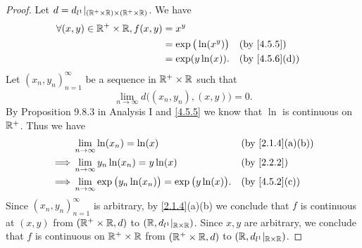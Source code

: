 \begin{proof}
  Let \(d = d_{l^1}|_{(\mathbb{R}^+ \times \mathbb{R}) \times (\mathbb{R}^+ \times \mathbb{R})}\).
  We have
  \begin{align*}
    \forall (x, y) \in \R^+ \times \R, f(x, y) & = x^y                                                     \\
                                               & = \exp\big(\ln(x^y)\big) &  & \by{4.5.5}                  \\
                                               & = \exp(y \ln(x)).        &  & \text{(by \cref{4.5.6}(d))}
  \end{align*}
  Let \((x_n, y_n)_{n = 1}^\infty\) be a sequence in \(\mathbb{R}^+ \times \mathbb{R}\) such that
  \[
    \lim_{n \to \infty} d\big((x_n, y_n), (x, y)\big) = 0.
  \]
  By Proposition 9.8.3 in Analysis I and \cref{4.5.5} we know that \(\ln\) is continuous on \(\mathbb{R}^+\).
  Thus we have
  \begin{align*}
             & \lim_{n \to \infty} \ln(x_n) = \ln(x)                                    &  & \text{(by \cref{2.1.4}(a)(b))} \\
    \implies & \lim_{n \to \infty} y_n \ln(x_n) = y \ln(x)                              &  & \by{2.2.2}                     \\
    \implies & \lim_{n \to \infty} \exp\big(y_n \ln(x_n)\big) = \exp\big(y \ln(x)\big). &  & \text{(by \cref{4.5.2}(c))}
  \end{align*}
  Since \((x_n, y_n)_{n = 1}^\infty\) is arbitrary, by \cref{2.1.4}(a)(b) we conclude that \(f\) is continuous at \((x, y)\) from \((\mathbb{R}^+ \times \mathbb{R}, d)\) to \((\mathbb{R}, d_{l^1}|_{\mathbb{R} \times \mathbb{R}})\).
  Since \(x, y\) are arbitrary, we conclude that \(f\) is continuous on \(\mathbb{R}^+ \times \mathbb{R}\) from \((\mathbb{R}^+ \times \mathbb{R}, d)\) to \((\mathbb{R}, d_{l^1}|_{\mathbb{R} \times \mathbb{R}})\).
\end{proof}